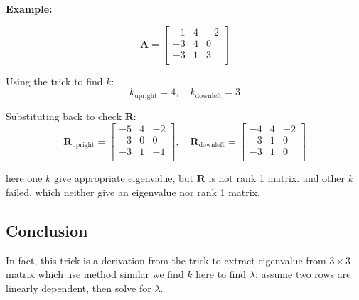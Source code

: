 \documentclass{article}
\begin{document}
\textbf{Example:} 

\[\boldsymbol A = \begin{bmatrix}
-1 & 4 & -2\\
-3 & 4 & 0\\
-3 & 1 &3\\
\end{bmatrix}\]

Using the trick to find \( k \):
\[
	k_{\text{upright}} = 4, \quad
	k_{\text{downleft}} = 3
\]

Substituting back to check \( \boldsymbol R \):
\[\boldsymbol R_{\text{upright}} = \begin{bmatrix}
-5 & 4 & -2\\
-3 & 0 & 0\\
-3 & 1 & -1\\
\end{bmatrix}, \quad
\boldsymbol R_{\text{downleft}} = \begin{bmatrix}
-4 & 4 & -2\\
-3 & 1 & 0\\
-3 & 1 & 0\\
\end{bmatrix}
\]

here one $k$ give appropriate eigenvalue, but $\boldsymbol R$ is not rank 1 matrix. and other $k$ failed, which neither give an eigenvalue nor rank 1 matrix.

\subsection{Conclusion}

In fact, this trick is a derivation from the trick to extract eigenvalue from 
$3\times3$ matrix which use method similar we find $k$ here to find $\lambda$:
assume two rows are linearly dependent, then solve for $\lambda$.
\end{document}
